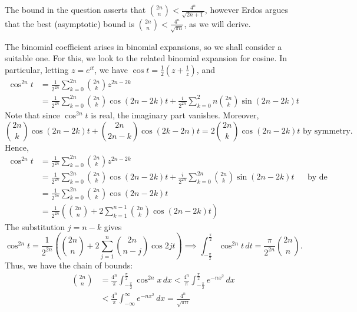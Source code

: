 \documentclass[../main.tex]{subfiles}
\begin{document}
    The bound in the question asserts that $\binom{2n}{n} < \frac{4^n}{\sqrt{2n+1}}$, however Erdos argues that the best (asymptotic) bound is $\binom{2n}{n} < \frac{4^n}{\sqrt{\pi n}}$, as we will derive.
    
    The binomial coefficient arises in binomial expansions, so we shall consider a suitable one. For this, we look to the related binomial expansion for cosine. In particular, letting $z=e^{it}$, we have $\cos{t} = \frac{1}{2}\left(z+\frac{1}{z}\right)$, and \begin{align*}
        \cos^{2n} t &= \frac{1}{2^{2n}}\sum_{k=0}^{2n} \binom{2n}{k}z^{2n-2k} \\
        &= \frac{1}{2^{2n}}\sum_{k=0}^{2n} \binom{2n}{k}\cos{(2n-2k)t}+\frac{i}{2^{2n}}\sum_{k=0}^2n \binom{2n}{k}\sin{(2n-2k)t}
    \end{align*}
    Note that since $\cos^{2n}{t}$ is real, the imaginary part vanishes. Moreover, $$\binom{2n}{k}\cos{(2n-2k)t}+\binom{2n}{2n-k}\cos{(2k-2n)t}=2\binom{2n}{k}\cos{(2n-2k)t}\text{ by symmetry}.$$
    Hence,
    \begin{align*}
        \cos^{2n} t &= \frac{1}{2^{2n}}\sum_{k=0}^{2n} \binom{2n}{k}z^{2n-2k} \\
        &= \frac{1}{2^{2n}}\sum_{k=0}^{2n} \binom{2n}{k}\cos{(2n-2k)t}+\frac{i}{2^{2n}}\sum_{k=0}^{2n} \binom{2n}{k}\sin{(2n-2k)t} && \text{by de Moivre's theorem}\\
        &= \frac{1}{2^{2n}}\sum_{k=0}^{2n} \binom{2n}{k}\cos{(2n-2k)t} \\
        &= \frac{1}{2^{2n}}\left(\binom{2n}{n}+2\sum_{k=1}^{n-1}\binom{2n}{k}\cos{(2n-2k)t}\right)
    \end{align*}
    The substitution $j=n-k$ gives
    $$
        \cos^{2n} t = \frac{1}{2^{2n}}\left(\binom{2n}{n}+2\sum_{j=1}^{n}\binom{2n}{n-j}\cos{2jt}\right)
    \implies
        \int_{-\frac{\pi}{2}}^{\frac{\pi}{2}}\cos^{2n} t \,dt = \frac{\pi}{2^{2n}}\binom{2n}{n}.
    $$
    Thus, we have the chain of bounds:
    \begin{align}
        \binom{2n}{n}&=\frac{4^n}{\pi}\int_{-\frac{\pi}{2}}^{\frac{\pi}{2}}\cos^{2n}{x} \,dx < \frac{4^n}{\pi}\int_{-\frac{\pi}{2}}^{\frac{\pi}{2}}e^{-nx^2} \,dx \label{5.1-tangent-ineq}\\
        &< \frac{4^n}{\pi}\int_{-\infty}^{\infty}e^{-nx^2} \,dx = \frac{4^n}{\sqrt{\pi n}} \label{5.1-tangent-eq}
    \end{align}
\end{document}
